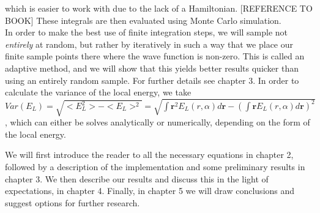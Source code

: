 which is easier to work with due to the lack of a Hamiltonian. [REFERENCE TO BOOK] These integrals are then evaluated using
Monte Carlo simulation. \\

In order to make the best use of finite integration steps, we will sample not \textit{entirely} at random, but rather by
iteratively in such a way that we place our finite sample points there where the wave function is non-zero. This is called
an adaptive method, and we will show that this yields better results quicker than using an entirely random sample.
For further details see chapter 3. In order to calculate the variance of the local energy, we take
$Var(E_L) = \sqrt{<E_L^2> - <E_L>^2} = \sqrt{ \int \textbf{r}^2 E_L(\textit{r},\alpha) d\textbf{r} -
(\int \textbf{r} E_L(\textit{r},\alpha)d\textbf{r})^2 } $,
which can either be solves analytically or numerically, depending on the form of the local energy.


We will first introduce the reader to all the necessary equations in chapter 2, followed by a description of the
implementation and some preliminary results in chapter 3. We then describe our results and discuss this in the light
of expectations, in chapter 4. Finally, in chapter 5 we will draw conclusions and suggest options for further research.
